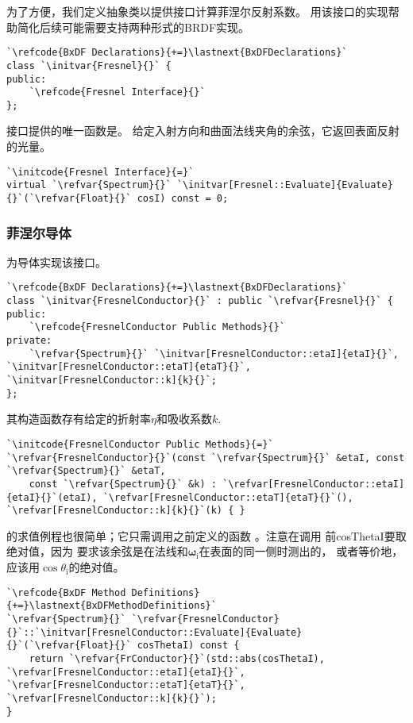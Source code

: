 为了方便，我们定义抽象类以提供接口计算菲涅尔反射系数。
用该接口的实现帮助简化后续可能需要支持两种形式的BRDF实现。
\begin{lstlisting}
`\refcode{BxDF Declarations}{+=}\lastnext{BxDFDeclarations}`
class `\initvar{Fresnel}{}` {
public:
    `\refcode{Fresnel Interface}{}`
};
\end{lstlisting}

接口提供的唯一函数是。
给定入射方向和曲面法线夹角的余弦，它返回表面反射的光量。
\begin{lstlisting}
`\initcode{Fresnel Interface}{=}`
virtual `\refvar{Spectrum}{}` `\initvar[Fresnel::Evaluate]{Evaluate}{}`(`\refvar{Float}{}` cosI) const = 0;
\end{lstlisting}

\subsubsection*{菲涅尔导体}
为导体实现该接口。
\begin{lstlisting}
`\refcode{BxDF Declarations}{+=}\lastnext{BxDFDeclarations}`
class `\initvar{FresnelConductor}{}` : public `\refvar{Fresnel}{}` {
public:
    `\refcode{FresnelConductor Public Methods}{}`
private:
    `\refvar{Spectrum}{}` `\initvar[FresnelConductor::etaI]{etaI}{}`, `\initvar[FresnelConductor::etaT]{etaT}{}`, `\initvar[FresnelConductor::k]{k}{}`;
};
\end{lstlisting}

其构造函数存有给定的折射率$\eta$和吸收系数$k$.
\begin{lstlisting}
`\initcode{FresnelConductor Public Methods}{=}`
`\refvar{FresnelConductor}{}`(const `\refvar{Spectrum}{}` &etaI, const `\refvar{Spectrum}{}` &etaT,
    const `\refvar{Spectrum}{}` &k) : `\refvar[FresnelConductor::etaI]{etaI}{}`(etaI), `\refvar[FresnelConductor::etaT]{etaT}{}`(), `\refvar[FresnelConductor::k]{k}{}`(k) { }
\end{lstlisting}

的求值例程也很简单；它只需调用之前定义的函数
。注意在调用
前{\ttfamily cosThetaI}要取绝对值，因为
要求该余弦是在法线和${\bm\omega}_{\mathrm{i}}$在表面的同一侧时测出的，
或者等价地，应该用$\cos\theta_{\mathrm{i}}$的绝对值。
\begin{lstlisting}
`\refcode{BxDF Method Definitions}{+=}\lastnext{BxDFMethodDefinitions}`
`\refvar{Spectrum}{}` `\refvar{FresnelConductor}{}`::`\initvar[FresnelConductor::Evaluate]{Evaluate}{}`(`\refvar{Float}{}` cosThetaI) const {
    return `\refvar{FrConductor}{}`(std::abs(cosThetaI), `\refvar[FresnelConductor::etaI]{etaI}{}`, `\refvar[FresnelConductor::etaT]{etaT}{}`, `\refvar[FresnelConductor::k]{k}{}`);
}
\end{lstlisting}

